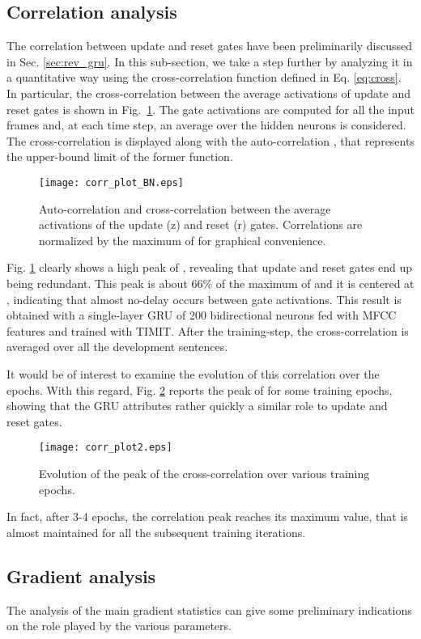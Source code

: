 \documentclass[journal]{IEEEtran}
\begin{document}
\subsection{Correlation analysis} \label{sec:corr}
The correlation between update and reset gates have been preliminarily discussed in Sec. \ref{sec:rev_gru}. In this sub-section, we take a step further by analyzing it in a quantitative way using the cross-correlation function defined in Eq. \ref{eq:cross}.
In particular, the cross-correlation  between the average activations of update  and reset  gates is shown in Fig.~\ref{fig:corr}.
The gate activations are computed for all the input frames and, at each time step, an average over the hidden neurons is considered.
The cross-correlation  is displayed along with the auto-correlation , that represents the upper-bound limit of the former function.  

\begin{figure}[t]
\centering
  \texttt{[image: corr\_plot\_BN.eps]}
\caption{Auto-correlation  and cross-correlation  between the average activations of the update (z) and reset (r) gates. Correlations are normalized by the maximum of  for graphical convenience.}\label{fig:corr}
\end{figure}
Fig. \ref{fig:corr} clearly shows a high peak of , revealing that update and reset gates end up being  redundant. This peak is about 66\% of the maximum of  and it is centered at , indicating that almost no-delay occurs between gate activations.  This result is obtained with a single-layer GRU of 200 bidirectional neurons fed with MFCC features and trained with TIMIT. After the training-step, the cross-correlation is averaged over all the development sentences.


It would be of interest to examine the evolution of this correlation over the epochs. With this regard, Fig. \ref{fig:corr2} reports the peak of  for some training epochs, showing that the GRU attributes rather quickly a similar role to update and reset gates. 
\begin{figure}[t]
\centering
  \texttt{[image: corr\_plot2.eps]}
\caption{Evolution of the  peak of the cross-correlation  over various training epochs.}\label{fig:corr2}
\end{figure}
In fact, after 3-4 epochs, the correlation peak reaches its maximum value, that is almost maintained for all the subsequent training iterations.   

\subsection{Gradient analysis} \label{sec:grad}
The analysis of the main gradient statistics can give some preliminary  indications on the role played by the various parameters. 
\end{document}
